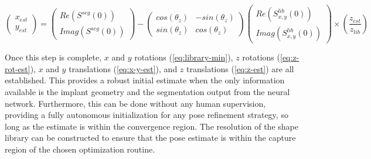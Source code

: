\begin{equation}
    \begin{pmatrix}
        x_{est} \\ y_{est}
    \end{pmatrix} = \begin{pmatrix}
        Re(S^{seg}(0)) \\ Imag(S^{seg}(0))
    \end{pmatrix} - \begin{pmatrix}
        cos(\theta_z) & -sin(\theta_z) \\ sin(\theta_z) & cos(\theta_z)
    \end{pmatrix}\begin{pmatrix}
        Re(S^{lib}_{x,y}(0)) \\ Imag(S^{lib}_{x,y}(0))
    \end{pmatrix} \times \left(\frac{z_{est}}{z_{lib}}\right)
    \label{eq:x-y-est}
\end{equation}

Once this step is complete, $x$ and $y$ rotations (\cref{eq:library-min}), $z$ rotations (\cref{eq:z-rot-est}), $x$ and $y$ translations (\cref{eq:x-y-est}), and $z$ translations (\cref{eq:z-est}) are all established.
This provides a robust initial estimate when the only information available is the implant geometry and the segmentation output from the neural network.
Furthermore, this can be done without any human supervision, providing a fully autonomous initialization for any pose refinement strategy, so long as the estimate is within the convergence region.
The resolution of the shape library can be constructed to ensure that the pose estimate is within the capture region of the chosen optimization routine.

